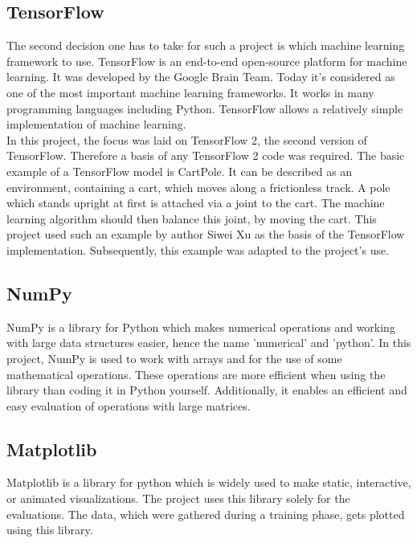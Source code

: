 \documentclass[12pt]{article}
\begin{document}
\subsection{TensorFlow}
The second decision one has to take for such a project is which \gls{machine learning} framework to use. TensorFlow \cite{TensorFlow} is an end-to-end open-source platform for \gls{machine learning}. It was developed by the Google Brain Team. Today it's considered as one of the most important \gls{machine learning} frameworks. It works in many programming languages including Python. TensorFlow allows a relatively simple implementation of \gls{machine learning}. \cite{TensorFlowWikipedia}\\
In this project, the focus was laid on TensorFlow 2, the second version of TensorFlow. Therefore a basis of any TensorFlow 2 code was required. The basic example of a TensorFlow model is \gls{CartPole}. It can be described as an \gls{environment}, containing a cart, which moves along a frictionless track. A pole which stands upright at first is attached via a joint to the cart. The \gls{machine learning} algorithm should then balance this joint, by moving the cart. This project used such an example by author Siwei Xu \cite{rl_tictactoe} as the basis of the TensorFlow implementation. Subsequently, this example was adapted to the project's use. \cite{rl_tictactoe}
\subsection{NumPy}
NumPy \cite{numpy} is a library for Python which makes numerical operations and working with large data structures easier, hence the name 'numerical' and 'python'. In this project, NumPy is used to work with arrays and for the use of some mathematical operations. These operations are more efficient when using the library than coding it in Python yourself. Additionally, it enables an efficient and easy evaluation of operations with large matrices. \cite{numpy}

\subsection{Matplotlib}
Matplotlib \cite{matplotlib} is a library for python which is widely used to make static, interactive, or animated visualizations. The project uses this library solely for the evaluations. The data, which were gathered during a training phase, gets plotted using this library. \cite{matplotlib}
\end{document}
